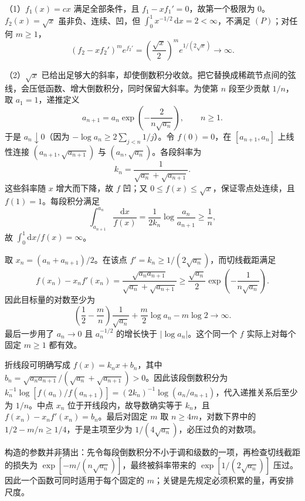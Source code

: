 \documentclass[UTF8,12pt,a4paper,fontset=fandol]{ctexart}
\begin{document}
\begin{solve}\label{ans:fin12-high:7}

（1）$f_1(x)=cx$ 满足全部条件，且 $f_1-xf_1'=0$，故第一个极限为 $0$。$f_2(x)=\sqrt x$ 虽非负、连续、凹，但 $\int_0^1x^{-1/2}\,\mathrm dx=2<\infty$，不满足 $(P)$；对任何 $m\geq1$，
\[
(f_2-xf_2')^me^{f_2'}=\left(\frac{\sqrt x}{2}\right)^me^{1/(2\sqrt x)}\longrightarrow\infty.
\]

（2）$\sqrt x$ 已给出足够大的斜率，却使倒数积分收敛。把它替换成稀疏节点间的弦线，会压低函数、增大倒数积分，同时保留大斜率。为使第 $n$ 段至少贡献 $1/n$，取 $a_1=1$，递推定义
\[
a_{n+1}=a_n\exp\left(-\frac2{n\sqrt{a_n}}\right),\qquad n\geq1.
\]
于是 $a_n\downarrow0$（因为 $-\log a_n\geq2\sum_{j<n}1/j$）。令 $f(0)=0$，在 $[a_{n+1},a_n]$ 上线性连接 $(a_{n+1},\sqrt{a_{n+1}})$ 与 $(a_n,\sqrt{a_n})$。各段斜率为
\[
k_n=\frac1{\sqrt{a_n}+\sqrt{a_{n+1}}}.
\]
这些斜率随 $x$ 增大而下降，故 $f$ 凹；又 $0\leq f(x)\leq\sqrt x$，保证零点处连续，且 $f(1)=1$。每段积分满足
\[
\int_{a_{n+1}}^{a_n}\frac{\mathrm dx}{f(x)}
=\frac1{2k_n}\log\frac{a_n}{a_{n+1}}\geq\frac1n,
\]
故 $\int_0^1\mathrm dx/f(x)=\infty$。

取 $x_n=(a_n+a_{n+1})/2$。在该点 $f'=k_n\geq1/(2\sqrt{a_n})$，而切线截距满足
\[
f(x_n)-x_nf'(x_n)=\frac{\sqrt{a_na_{n+1}}}{\sqrt{a_n}+\sqrt{a_{n+1}}}
\geq\frac{\sqrt{a_n}}2\exp\left(-\frac1{n\sqrt{a_n}}\right).
\]
因此目标量的对数至少为
\[
\left(\frac12-\frac mn\right)\frac1{\sqrt{a_n}}+\frac m2\log a_n-m\log2\longrightarrow\infty.
\]
最后一步用了 $a_n\to0$ 且 $a_n^{-1/2}$ 的增长快于 $|\log a_n|$。这个同一个 $f$ 实际上对每个固定 $m\geq1$ 都有效。

折线段可明确写成 $f(x)=k_nx+b_n$，其中 $b_n=\sqrt{a_na_{n+1}}/(\sqrt{a_n}+\sqrt{a_{n+1}})>0$。因此该段倒数积分为 $k_n^{-1}\log[f(a_n)/f(a_{n+1})]=(2k_n)^{-1}\log(a_n/a_{n+1})$，代入递推关系后至少为 $1/n$。中点 $x_n$ 位于开线段内，故导数确实等于 $k_n$，且 $f(x_n)-x_nf'(x_n)=b_n$。最后对固定 $m$ 取 $n\ge4m$，对数下界中的 $1/2-m/n\ge1/4$，于是主项至少为 $1/(4\sqrt{a_n})$，必压过负的对数项。

\end{solve}

\begin{remark}[方法与条件]构造的参数并非猜出：先令每段倒数积分不小于调和级数的一项，再检查切线截距的损失为 $\exp[-m/(n\sqrt{a_n})]$，最终被斜率带来的 $\exp[1/(2\sqrt{a_n})]$ 压过。因此一个函数可同时适用于每个固定的 $m$；关键是先规定必须积累的量，再安排尺度。\end{remark}
\end{document}
